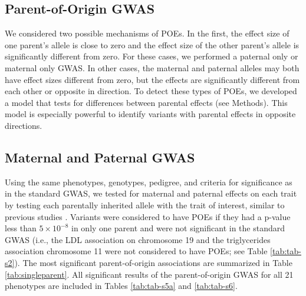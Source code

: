 \subsection{Parent-of-Origin GWAS}\label{Parent-of-Origin GWAS}
We considered two possible mechanisms of POEs. In the first, the effect size of one parent's allele is close to zero and the effect size of the other parent's allele is significantly different from zero. For these cases, we performed a paternal only or maternal only GWAS. In other cases, the maternal and paternal alleles may both have effect sizes different from zero, but the effects are significantly different from each other or opposite in direction. To detect these types of POEs, we developed a model that tests for differences between parental effects (see Methods). This model is especially powerful to identify variants with parental effects in opposite directions.

\subsection{Maternal and Paternal GWAS}\label{Maternal and Paternal GWAS}
Using the same phenotypes, genotypes, pedigree, and criteria for significance as in the standard GWAS, we tested for maternal and paternal effects on each trait by testing each parentally inherited allele with the trait of interest, similar to previous studies \citep{Kong:2009kk,Zoledziewska:2015do,Garg2012a}. Variants were considered to have POEs if they had a p-value less than $5 \times10^{-8}$ in only one parent and were not significant in the standard GWAS (i.e., the LDL association on chromosome 19 and the triglycerides association chromosome 11 were not considered to have POEs; see Table \ref{tab:tab-s2}). The most significant parent-of-origin associations are summarized in Table \ref{tab:singleparent}. All significant results of the parent-of-origin GWAS for all 21 phenotypes are included in Tables \ref{tab:tab-s5a} and \ref{tab:tab-s6}. 


